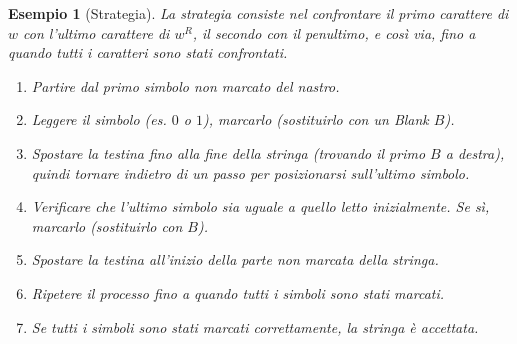 \documentclass[a4paper]{article}
\newtheorem{example}{Esempio}
\begin{document}
\begin{example}[Strategia]
La strategia consiste nel confrontare il primo carattere di $w$ con l'ultimo carattere di $w^R$, il secondo con il penultimo, e così via, fino a quando tutti i caratteri sono stati confrontati.
\begin{enumerate}
    \item Partire dal primo simbolo non marcato del nastro.
    \item Leggere il simbolo (es. $0$ o $1$), marcarlo (sostituirlo con un Blank $B$).
    \item Spostare la testina fino alla fine della stringa (trovando il primo $B$ a destra), quindi tornare indietro di un passo per posizionarsi sull'ultimo simbolo.
    \item Verificare che l'ultimo simbolo sia uguale a quello letto inizialmente. Se sì, marcarlo (sostituirlo con $B$).
    \item Spostare la testina all'inizio della parte non marcata della stringa.
    \item Ripetere il processo fino a quando tutti i simboli sono stati marcati.
    \item Se tutti i simboli sono stati marcati correttamente, la stringa è accettata.
\end{enumerate}
\end{example}
\end{document}
